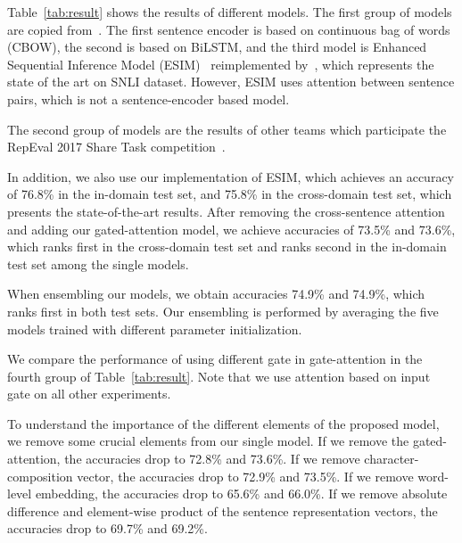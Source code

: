 \documentclass[11pt,letterpaper]{article}
\begin{document}
Table~\ref{tab:result} shows the results of different models. The first group of models are copied from~\citet{DBLP:journals/corr/WilliamsNB17}. The first sentence encoder is based on continuous bag of words (CBOW), the second is based on BiLSTM, and the third model is Enhanced Sequential Inference Model (ESIM)~\citep{DBLP:journals/corr/ChenZLWJ16}
reimplemented by~\citet{DBLP:journals/corr/WilliamsNB17}, which represents the state of the art on SNLI dataset. However, ESIM uses attention between sentence pairs, which is not a sentence-encoder based model.

The second group of models are the results of other teams which participate the RepEval 2017 Share Task competition~\citep{nangia2017repeval}. 

In addition, we also use our implementation of ESIM, which achieves an accuracy of 76.8\% in the in-domain test set, and 75.8\% in the cross-domain test set, which presents the state-of-the-art results. 
After removing the cross-sentence attention and adding our gated-attention model, we achieve accuracies of 73.5\% and 73.6\%, which ranks first in the cross-domain test set and ranks second in the in-domain test set among the single models. 

When ensembling our models, we obtain accuracies 74.9\% and 74.9\%, which ranks first in both test sets. Our ensembling is performed by averaging the five models trained with different parameter initialization.

We compare the performance of using different gate in gate-attention in the fourth group of Table~\ref{tab:result}. Note that we use attention based on input gate on all other experiments.

To understand the importance of the different elements of the proposed model, we remove some crucial elements from our single model. 
If we remove the gated-attention, the accuracies drop to 72.8\% and 73.6\%. 
If we remove character-composition vector, the accuracies drop to 72.9\% and 73.5\%. If we remove word-level embedding, the accuracies drop to 65.6\% and 66.0\%. If we remove absolute difference and element-wise product of the sentence representation vectors, the accuracies drop to 69.7\% and 69.2\%. 
\end{document}
